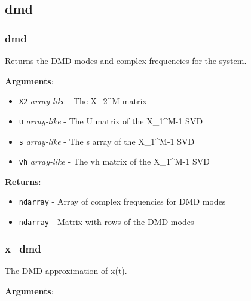 \subsection{dmd}

\subsubsection{dmd}

\begin{Shaded}
\begin{Highlighting}[]
\end{Highlighting}
\end{Shaded}

Returns the DMD modes and complex frequencies for the system.

\textbf{Arguments}:

\begin{itemize}
\tightlist
\item
  \texttt{X2} \emph{array-like} - The X\_2\^{}M matrix
\item
  \texttt{u} \emph{array-like} - The U matrix of the X\_1\^{}M-1 SVD
\item
  \texttt{s} \emph{array-like} - The s array of the X\_1\^{}M-1 SVD
\item
  \texttt{vh} \emph{array-like} - The vh matrix of the X\_1\^{}M-1 SVD
\end{itemize}

\textbf{Returns}:

\begin{itemize}
\tightlist
\item
  \texttt{ndarray} - Array of complex frequencies for DMD modes
\item
  \texttt{ndarray} - Matrix with rows of the DMD modes
\end{itemize}

\subsubsection{x\_dmd}

\begin{Shaded}
\begin{Highlighting}[]
\end{Highlighting}
\end{Shaded}

The DMD approximation of x(t).

\textbf{Arguments}:

